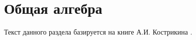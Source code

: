 \chapter{Общая алгебра}

Текст данного раздела базируется на книге А.И. Кострикина \cite{Kostrikin}.









